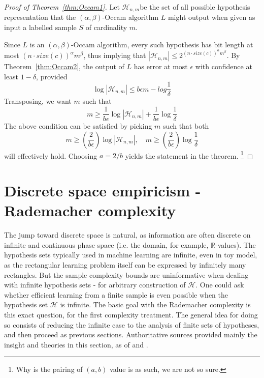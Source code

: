 \begin{proof}[Proof of Theorem~\ref{thm:Occam1}]
    Let $\mathcal{H}_{n,m}$be the set of all possible hypothesis representation that the $(\alpha,\beta)$-Occam algorithm $L$ might output when given as input a labelled sample $S$ of cardinality $m$. 

    Since $L$ is an $(\alpha,\beta)$-Occam algorithm, every such hypothesis has bit length at most $(n\cdot size(c))^{\alpha}m^{\beta}$, thus implying that $|\mathcal{H}_{n,m}|\leq 2^{(n\cdot size(c))^{\alpha}m^{\beta}}$. By Theorem~\ref{thm:Occam2}, the output of $L$ has error at most $\epsilon$ with confidence at least $1-\delta$, provided 
    \begin{equation}
        \log{|\mathcal{H}_{n,m}|} \leq b\epsilon m - log{\frac{1}{\delta}}
    \end{equation}
    Transposing, we want $m$ such that 
    \begin{equation}
        m\geq \frac{1}{b\epsilon} \log{|\mathcal{H}_{n,m}|} + \frac{1}{b\epsilon}\log{\frac{1}{\delta}}
    \end{equation}
    The above condition can be satisfied by picking $m$ such that both \begin{equation}
        m\geq \left(\frac{2}{b\epsilon}\right) \log{|\mathcal{H}_{n,m}|} , \quad m \geq \left(\frac{2}{b\epsilon}\right) \log{\frac{1}{\delta}}
    \end{equation}
    will effectively hold. Choosing $a=2/b$ yields the statement in the theorem. \footnote{Why is the pairing of $(a,b)$ value is as such, we are not so sure.}
\end{proof}



\section{Discrete space empiricism - Rademacher complexity}

The jump toward discrete space is natural, as information are often discrete on infinite and continuous phase space (i.e. the domain, for example, $\mathbb{R}$-values). The hypothesis sets typically used in machine learning are infinite, even in toy model, as the rectangular learning problem itself can be expressed by infinitely many rectangles. But the sample complexity bounds are uninformative when dealing with infinite hypothesis sets - for arbitrary construction of $\mathcal{H}$. One could ask whether efficient learning from a finite sample is even possible when the hypothesis set $\mathcal{H}$ is infinite. The basic goal with the Rademacher complexity is this exact question, for the first complexity treatment. The general idea for doing so consists of reducing the infinite case to the analysis of finite sets of hypotheses, and then proceed as previous sections. Authoritative sources provided mainly the insight and theories in this section, as of \cite{10.5555/2371238} and \cite{bartlett2002rademacher}. 

